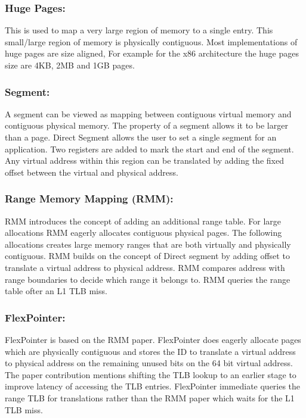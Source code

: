 \subsubsection{Huge Pages:}
This is used to map a very large region of memory to a 
single entry. This small/large region of memory is physically
contiguous. Most implementations of huge pages \cite{panwar_hawkeye_2019} are size
aligned, For example for the x86 architecture the huge pages 
size are 4KB, 2MB and 1GB pages. 

\subsubsection{Segment:}
A segment\cite{basu_efficient_nodate} can be viewed as mapping between contiguous virtual
memory and contiguous physical memory. The property of a 
segment allows it to be larger than a page. Direct Segment allows the user to set a single segment
for an application. Two registers are added to mark the start
and end of the segment. Any virtual address within this region
can be translated by adding the fixed offset between the virtual
and physical address.

\subsubsection{Range Memory Mapping (RMM):}
RMM\cite{karakostas_redundant_2015} introduces the concept of adding an additional range table.
For large allocations RMM eagerly allocates contiguous physical pages.
The following allocations creates large memory ranges that are
both virtually and physically contiguous. RMM builds on the concept
of Direct segment by adding offset to translate a virtual address 
to physical address. RMM compares address with range boundaries 
to decide which range it belongs to. RMM queries the range table 
ofter an L1 TLB miss.

\subsubsection{FlexPointer:}
FlexPointer\cite{chen_flexpointer_2023} is based on the RMM\cite{karakostas_redundant_2015} paper. FlexPointer
does eagerly allocate pages which are physically contiguous and stores the ID to translate a virtual address 
to physical address on the remaining unused bits on the 64 bit virtual address. 
The paper contribution mentions shifting the TLB lookup to an earlier stage to improve
latency of accessing the TLB entries. FlexPointer immediate queries the 
range TLB for translations rather than the RMM paper which waits for the L1 TLB miss.

